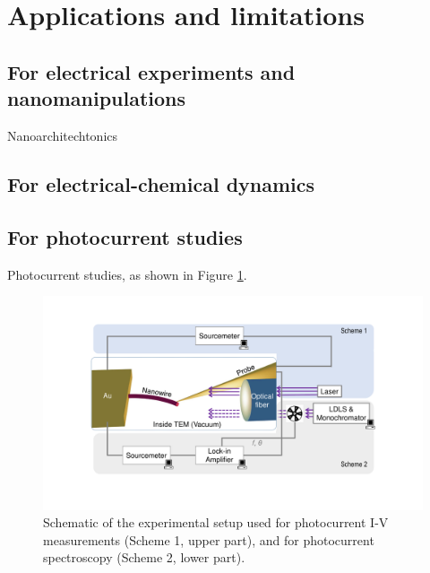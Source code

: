 \section{Applications and limitations}
\subsection{For electrical experiments and nanomanipulations}
Nanoarchitechtonics 


\subsection{For electrical-chemical dynamics}

\subsection{For photocurrent studies}
Photocurrent studies, as shown in Figure \ref{fig:6_1}. 

\begin{figure}  
\includegraphics[width=\textwidth]{figures/figure6_1}
\caption[Two experimental scheme]
{Schematic of the experimental setup used for photocurrent I-V measurements (Scheme 1, upper part), and for photocurrent spectroscopy (Scheme 2, lower part).
\label{fig:6_1}}
\end{figure}


